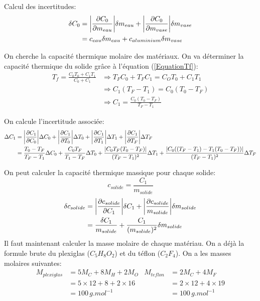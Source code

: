 \documentclass[12pt]{article}
\begin{document}
Calcul des incertitudes:
\begin{align*}
\delta C_0&= \abs{\frac{\partial C_0}{\partial m_{eau}}} \delta m_{eau} + \abs{\frac{\partial C_0}{\partial m_{vase}}} \delta m_{vase}\\
&=c_{eau}\delta m_{eau}+c_{aluminium}\delta m_{vase}
\end{align*}



On cherche la capacité thermique molaire des matériaux. On va déterminer la capacité thermique du solide grâce à l'équation (\ref{EquationTf}):
\begin{align*}
T_f=\frac{C_0T_0+C_1T_1}{C_0+C_1} &\Rightarrow T_FC_0+T_FC_1=C_OT_0+C_1T_1 \\
&\Rightarrow C_1(T_F-T_1)=C_0(T_0-T_F) \\
&\Rightarrow C_1=\frac{C_0(T_0-T_F)}{T_F-T_1}
\end{align*}

On calcule l'incertitude associée:
\begin{align*}
\Delta C_1 &= \abs{\frac{\partial C_1}{\partial C_0}} \Delta C_0 + \abs{\frac{\partial C_1}{\partial T_0}} \Delta T_0 + \abs{\frac{\partial C_1}{\partial T_1}} \Delta T_1 + \abs{\frac{\partial C_1}{\partial T_F}} \Delta T_F \\
&= \frac{T_0-T_F}{T_F-T_1}\Delta C_0 + \frac{C_0T_F}{T_1-T_F}\Delta T_0 + \frac{\abs{C_0T_F(T_0-T_F)}}{(T_F-T_1)^2}\Delta T_1 + \frac{\abs{C_0((T_F-T_1)-T_1(T_0-T_F))}}{(T_F-T_1)^2}\Delta T_F
\end{align*}




On peut calculer la capacité thermique massique pour chaque solide:
\begin{equation}
c_{solide}=\frac{C_1}{m_{solide}}
\end{equation}
\begin{align*}
\delta c_{solide}&=\abs{\frac{\partial c_{solide}}{\partial C_1}}\delta C_1 + \abs{\frac{\partial c_{solide}}{m_{solide}}}\delta m_{solide} \\
&=\frac{\delta C_1}{m_{solide}}+ \frac{C_1}{(m_{solide})^2}\delta m_{solide}
\end{align*}
Il faut maintenant calculer la masse molaire de chaque matériau. On a déjà la formule brute du plexiglas ($C_5H_8O_2$) et du téflon ($C_2F_4$). On a les masses molaires suivantes:
\begin{align*}
M_{plexiglas}&=5M_C+8M_H+2M_O & M_{teflon}&=2M_C+4M_F  \\
&=5\times 12+8+2\times 16 & &=2\times 12+4\times 19 \\
&=100\, g.mol^{-1} & &=100\, g.mol^{-1}
\end{align*}
\end{document}
